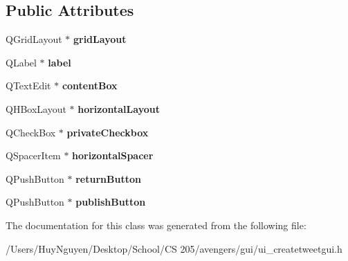 \subsection*{Public Attributes}
\begin{DoxyCompactItemize}
\item 
Q\+Grid\+Layout $\ast$ {\bfseries grid\+Layout}\hypertarget{classUi__CreateTweetGUI_a9b635ffdff3445397401aff0a67792c3}{}\label{classUi__CreateTweetGUI_a9b635ffdff3445397401aff0a67792c3}

\item 
Q\+Label $\ast$ {\bfseries label}\hypertarget{classUi__CreateTweetGUI_a24ecb923e20b337c0e42c7a692131ab7}{}\label{classUi__CreateTweetGUI_a24ecb923e20b337c0e42c7a692131ab7}

\item 
Q\+Text\+Edit $\ast$ {\bfseries content\+Box}\hypertarget{classUi__CreateTweetGUI_a4c83728c31857680d36713e4650e27dc}{}\label{classUi__CreateTweetGUI_a4c83728c31857680d36713e4650e27dc}

\item 
Q\+H\+Box\+Layout $\ast$ {\bfseries horizontal\+Layout}\hypertarget{classUi__CreateTweetGUI_a617ab21919e86507d20f2e54e6914e84}{}\label{classUi__CreateTweetGUI_a617ab21919e86507d20f2e54e6914e84}

\item 
Q\+Check\+Box $\ast$ {\bfseries private\+Checkbox}\hypertarget{classUi__CreateTweetGUI_ad6ac64c61fc568aa6deff266538c7a51}{}\label{classUi__CreateTweetGUI_ad6ac64c61fc568aa6deff266538c7a51}

\item 
Q\+Spacer\+Item $\ast$ {\bfseries horizontal\+Spacer}\hypertarget{classUi__CreateTweetGUI_aaab0d29e2740a9ce2c81347ae11078d2}{}\label{classUi__CreateTweetGUI_aaab0d29e2740a9ce2c81347ae11078d2}

\item 
Q\+Push\+Button $\ast$ {\bfseries return\+Button}\hypertarget{classUi__CreateTweetGUI_a25060861fe881de58dc3a8fd50b7b5e4}{}\label{classUi__CreateTweetGUI_a25060861fe881de58dc3a8fd50b7b5e4}

\item 
Q\+Push\+Button $\ast$ {\bfseries publish\+Button}\hypertarget{classUi__CreateTweetGUI_a43e91e3255a59c13dfacc0f3cbd5e744}{}\label{classUi__CreateTweetGUI_a43e91e3255a59c13dfacc0f3cbd5e744}

\end{DoxyCompactItemize}


The documentation for this class was generated from the following file\+:\begin{DoxyCompactItemize}
\item 
/\+Users/\+Huy\+Nguyen/\+Desktop/\+School/\+C\+S 205/avengers/gui/ui\+\_\+createtweetgui.\+h\end{DoxyCompactItemize}

